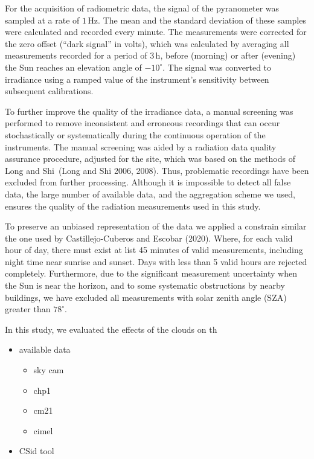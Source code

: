 \documentclass[
]{article}
\providecommand{\tightlist}{%
  \setlength{\itemsep}{0pt}\setlength{\parskip}{0pt}}
\begin{document}
For the acquisition of radiometric data, the signal of the pyranometer was sampled
at a rate of \(1\,\text{Hz}\).
The mean and the standard deviation of these samples were calculated and recorded
every minute.
The measurements were corrected for the zero offset (``dark signal'' in volts), which
was calculated by averaging all measurements recorded for a period of \(3\,\text{h}\),
before (morning) or after (evening) the Sun reaches an elevation angle of \(-10^\circ\).
The signal was converted to irradiance using a ramped value of the instrument's
sensitivity between subsequent calibrations.

To further improve the quality of the irradiance data, a manual screening was
performed to remove inconsistent and erroneous recordings that can occur
stochastically or systematically during the continuous operation of the instruments.
The manual screening was aided by a radiation data quality assurance procedure,
adjusted for the site, which was based on the methods of Long and Shi~(Long and Shi 2006, 2008).
Thus, problematic recordings have been excluded from further processing.
Although it is impossible to detect all false data, the large number of available
data, and the aggregation scheme we used, ensures the quality of the radiation
measurements used in this study.

To preserve an unbiased representation of the data we applied a constrain similar
the one used by Castillejo-Cuberos and Escobar (2020). Where, for each valid hour of day, there
must exist at list 45 minutes of valid measurements, including night time near
sunrise and sunset. Days with less than 5 valid hours are rejected completely.
Furthermore, due to the significant measurement uncertainty when the Sun is near the
horizon, and to some systematic obstructions by nearby buildings, we have excluded
all measurements with solar zenith angle (SZA) greater than \(78^\circ\).

In this study, we evaluated the effects of the clouds on th

\begin{itemize}
\tightlist
\item
  available data

  \begin{itemize}
  \tightlist
  \item
    sky cam
  \item
    chp1
  \item
    cm21
  \item
    cimel
  \end{itemize}
\item
  CSid tool
\end{itemize}
\end{document}
